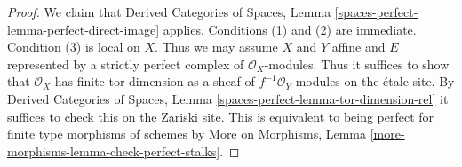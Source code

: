 \documentclass[10pt,a4paper]{amsart}
\theoremstyle{plain}
\theoremstyle{definition}
\theoremstyle{remark}
\numberwithin{equation}{subsection}
\begin{document}
\begin{proof}
We claim that Derived Categories of Spaces, Lemma
\ref{spaces-perfect-lemma-perfect-direct-image} applies.
Conditions (1) and (2) are immediate. Condition (3) is local
on $X$. Thus we may assume $X$ and $Y$ affine and $E$
represented by a strictly perfect complex of $\mathcal{O}_X$-modules.
Thus it suffices to show that $\mathcal{O}_X$ has finite
tor dimension as a sheaf of $f^{-1}\mathcal{O}_Y$-modules
on the \'etale site. By Derived Categories of Spaces, Lemma
\ref{spaces-perfect-lemma-tor-dimension-rel} it suffices to
check this on the Zariski site. This is equivalent to being perfect
for finite type morphisms of schemes by More on Morphisms,
Lemma \ref{more-morphisms-lemma-check-perfect-stalks}.
\end{proof}
\end{document}
